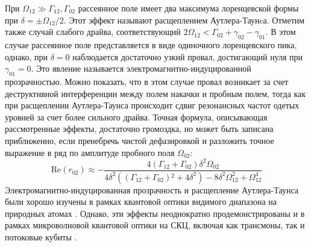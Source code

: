 При $\Omega_{12} \gg \Gamma_{12}, \Gamma_{02}$ рассеянное поле имеет два максимума лоренцевской формы при $\delta = \pm \Omega_{12}/2$. Этот эффект называют расщеплением Аутлера-Таунcа. Отметим также случай слабого драйва, соответствующий $2\Omega_{12}<\Gamma_{02}+\gamma_{02}-\gamma_{01}$. В этом случае рассеянное поле представляется в виде одиночного лоренцевского пика, однако, при $\delta=0$ наблюдается достаточно узкий провал, достигающий нуля при $\gamma_{01}=0$. Это явление называется электромагнитно-индуцированной прозрачностью. Можно показать, что в этом случае провал возникает за счет деструктивной интерференции между полем накачки и пробным полем, тогда как при расщеплении Аутлера-Таунса происходит сдвиг резонансных частот одетых уровней за счет более сильного драйва.
Точная формула, описывающая рассмотренные эффекты, достаточно громоздка, но может быть записана приближенно, если пренебречь чистой дефазировкой и разложить точное выражение в ряд по амплитуде пробного поля $\Omega_{02}$:
\begin{equation}
\text{Re}\left(r_{02}\right)\approx -\frac{4 \left(\Gamma _{12}+\Gamma _{02}\right) \delta ^2 \Omega_{02}}{4 \delta ^2 \left(\left(\Gamma _{12}+\Gamma _{02}\right){}^2+4 \delta^2\right)-8
	\delta ^2 \Omega_{12} ^2+\Omega_{12} ^4}
\end{equation}
Электромагнитно-индуцированная прозрачность и расщепление Аутлера-Таунса были хорошо изучены в рамках квантовой оптики видимого диапазона на природных атомах \cite{Boller_EIT,picque1976direct}. Однако, эти эффекты неоднократно продемонстрированы и в рамках микроволновой квантовой оптики на СКЦ, включая как трансмоны, так и потоковые кубиты \cite{Abdumalikov_EIT, Baur, ATS_3LS, li2012dynamical,ATS_3D_transmon}. 

